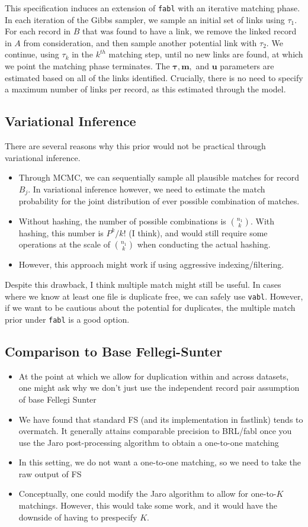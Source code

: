 \documentclass[12pt,letterpaper]{article}
\newcommand{\1}[1]{\mathbb{I}\!\left[#1\right]} %
\begin{document}
This specification induces an extension of \texttt{fabl} with an iterative matching phase. In each iteration of the Gibbs sampler, we sample an initial set of links using $\tau_1$. For each record in $B$ that was found to have a link, we remove the linked record in $A$ from consideration, and then sample another potential link with $\tau_2$. We continue, using $\tau_k$ in the $k^{th}$ matching step, until no new links are found, at which we point the matching phase terminates. The $\bm{\tau}, \bm{m},$ and $\bm{u}$ parameters are estimated based on all of the links identified. Crucially, there is no need to specify a maximum number of links per record, as this estimated through the model.

\subsection{Variational Inference}
There are several reasons why this prior would not be practical through variational inference.
\begin{itemize}
	\item Through MCMC, we can sequentially sample all plausible matches for record $B_j$. In variational inference however, we need to estimate the match probability for the joint distribution of ever possible combination of matches. 
	\item Without hashing, the number of possible combinations is $n_1 \choose k$. With hashing, this number is $P^k / k!$ (I think), and would still require some operations at the scale of $n_1 \choose k$ when conducting the actual hashing.
	\item However, this approach might work if using aggressive indexing/filtering.  
\end{itemize}
Despite this drawback, I think multiple match might still be useful. In cases where we know at least one file is duplicate free, we can safely use \texttt{vabl}. However, if we want to be cautious about the potential for duplicates, the multiple match prior under \texttt{fabl} is a good option. 

\subsection{Comparison to Base Fellegi-Sunter}
\begin{itemize}
	\item At the point at which we allow for duplication within and across datasets, one might ask why we don't just use the independent record pair assumption of base Fellegi Sunter
	\item We have found that standard FS (and its implementation in fastlink) tends to overmatch. It generally attains comparable precision to BRL/fabl once you use the Jaro post-processing algorithm to obtain a one-to-one matching
	\item In this setting, we do not want a one-to-one matching, so we need to take the raw output of FS
	\item Conceptually, one could modify the Jaro algorithm to allow for one-to-$K$ matchings. However, this would take some work, and it would have the downside of having to prespecify $K$. 
\end{itemize}
\end{document}
